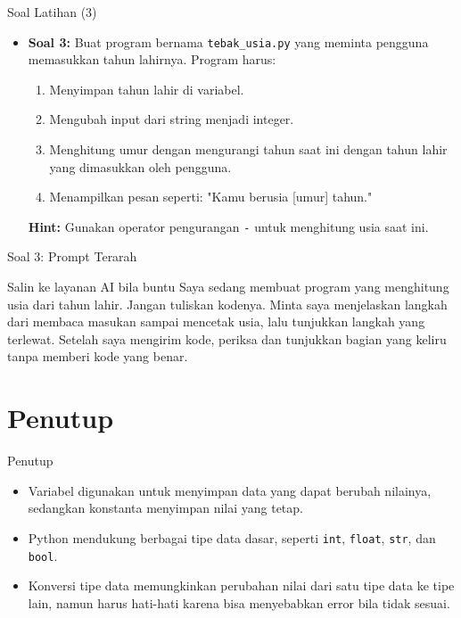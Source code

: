 \documentclass[aspectratio=169, table]{beamer}
\begin{document}
\begin{frame}[fragile]{Soal Latihan (3)}
\begin{itemize}
\item \textbf{Soal 3:} Buat program bernama \texttt{tebak_usia.py} yang meminta pengguna memasukkan tahun lahirnya. Program harus:
\begin{enumerate}
    \item Menyimpan tahun lahir di variabel.
    \item Mengubah input dari string menjadi integer.
    \item Menghitung umur dengan mengurangi tahun saat ini dengan tahun lahir yang dimasukkan oleh pengguna.
    \item Menampilkan pesan seperti: "Kamu berusia [umur] tahun."
\end{enumerate}

\textbf{Hint:} Gunakan operator pengurangan \texttt{-} untuk menghitung usia saat ini.
\end{itemize}
\end{frame}

\begin{frame}{Soal 3: Prompt Terarah}
\begin{block}{Salin ke layanan AI bila buntu}
\small Saya sedang membuat program yang menghitung usia dari tahun lahir. Jangan tuliskan kodenya. Minta saya menjelaskan langkah dari membaca masukan sampai mencetak usia, lalu tunjukkan langkah yang terlewat. Setelah saya mengirim kode, periksa dan tunjukkan bagian yang keliru tanpa memberi kode yang benar.
\end{block}
\end{frame}

\section{Penutup}
\begin{frame}[fragile]{Penutup}
\begin{itemize}
    \item Variabel digunakan untuk menyimpan data yang dapat berubah nilainya, sedangkan konstanta menyimpan nilai yang tetap.
    \item Python mendukung berbagai tipe data dasar, seperti \texttt{int}, \texttt{float}, \texttt{str}, dan \texttt{bool}.
    \item Konversi tipe data memungkinkan perubahan nilai dari satu tipe data ke tipe lain, namun harus hati-hati karena bisa menyebabkan error bila tidak sesuai.
\end{itemize}
\end{frame}
\end{document}

